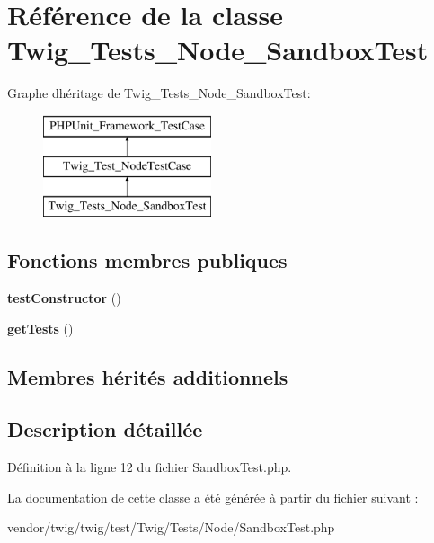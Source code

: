 \hypertarget{class_twig___tests___node___sandbox_test}{}\section{Référence de la classe Twig\+\_\+\+Tests\+\_\+\+Node\+\_\+\+Sandbox\+Test}
\label{class_twig___tests___node___sandbox_test}
Graphe d\textquotesingle{}héritage de Twig\+\_\+\+Tests\+\_\+\+Node\+\_\+\+Sandbox\+Test\+:\begin{figure}[H]
\begin{center}
\leavevmode
\includegraphics[height=3.000000cm]{class_twig___tests___node___sandbox_test}
\end{center}
\end{figure}
\subsection*{Fonctions membres publiques}
\begin{DoxyCompactItemize}
\item 
{\bfseries test\+Constructor} ()\hypertarget{class_twig___tests___node___sandbox_test_a47094dc941e72950570900d1418f89c6}{}\label{class_twig___tests___node___sandbox_test_a47094dc941e72950570900d1418f89c6}

\item 
{\bfseries get\+Tests} ()\hypertarget{class_twig___tests___node___sandbox_test_a7e247dd31cc8d37a6c97353a062a0080}{}\label{class_twig___tests___node___sandbox_test_a7e247dd31cc8d37a6c97353a062a0080}

\end{DoxyCompactItemize}
\subsection*{Membres hérités additionnels}


\subsection{Description détaillée}


Définition à la ligne 12 du fichier Sandbox\+Test.\+php.



La documentation de cette classe a été générée à partir du fichier suivant \+:\begin{DoxyCompactItemize}
\item 
vendor/twig/twig/test/\+Twig/\+Tests/\+Node/Sandbox\+Test.\+php\end{DoxyCompactItemize}
